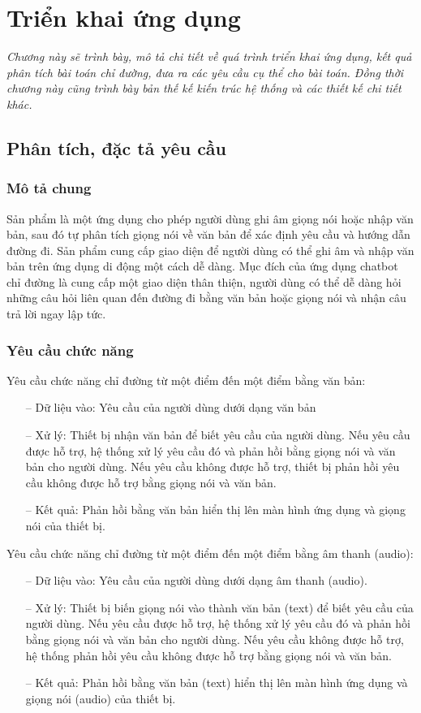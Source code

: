 \chapter{Triển khai ứng dụng}
\label{Chapter5}

\emph{Chương này sẽ trình bày, mô tả chi tiết về quá trình triển khai ứng dụng, kết quả phân tích bài toán chỉ đường, đưa ra các yêu cầu cụ thể cho bài toán. Đồng thời chương này cũng trình bày bản thế kế kiến trúc hệ thống và các thiết kế chi tiết khác.}

\section{Phân tích, đặc tả yêu cầu}

\subsection{Mô tả chung}
Sản phẩm là một ứng dụng cho phép người dùng ghi âm giọng nói hoặc nhập văn bản, sau đó tự phân tích giọng nói về văn bản để xác định yêu cầu và hướng dẫn đường đi. Sản phẩm cung cấp giao diện để người dùng có thể ghi âm và nhập văn bản trên ứng dụng di động một cách dễ dàng.
Mục đích của ứng dụng chatbot chỉ đường là cung cấp một giao diện thân thiện, người dùng có thể dễ dàng hỏi những câu hỏi liên quan đến đường đi bằng văn bản hoặc giọng nói và nhận câu trả lời ngay lập tức.
\subsection{Yêu cầu chức năng}

Yêu cầu chức năng chỉ đường từ một điểm đến một điểm bằng văn bản:
\begin{itemize}
    \item[--] Dữ liệu vào: Yêu cầu của người dùng dưới dạng văn bản
    \item[--] Xử lý: Thiết bị nhận văn bản để biết yêu cầu của người dùng. Nếu yêu cầu được hỗ trợ, hệ thống xử lý yêu cầu đó và phản hồi bằng giọng nói và văn bản cho người dùng. Nếu yêu cầu không được hỗ trợ, thiết bị phản hồi yêu cầu không được hỗ trợ bằng giọng nói và văn bản.
    \item[--] Kết quả: Phản hồi bằng văn bản hiển thị lên màn hình ứng dụng và giọng nói của thiết bị.
\end{itemize}
Yêu cầu chức năng chỉ đường từ một điểm đến một điểm bằng âm thanh (audio):
\begin{itemize}
    \item[--] Dữ liệu vào: Yêu cầu của người dùng dưới dạng âm thanh (audio). 
    \item[--] Xử lý: Thiết bị biến giọng nói vào thành văn bản (text) để biết yêu cầu của người dùng. Nếu yêu cầu được hỗ trợ, hệ thống xử lý yêu cầu đó và phản hồi bằng giọng nói và văn bản cho người dùng. Nếu yêu cầu không được hỗ trợ, hệ thống phản hồi yêu cầu không được hỗ trợ bằng giọng nói và văn bản.
    \item[--] Kết quả: Phản hồi bằng văn bản (text) hiển thị lên màn hình ứng dụng và giọng nói (audio) của thiết bị.
\end{itemize}

